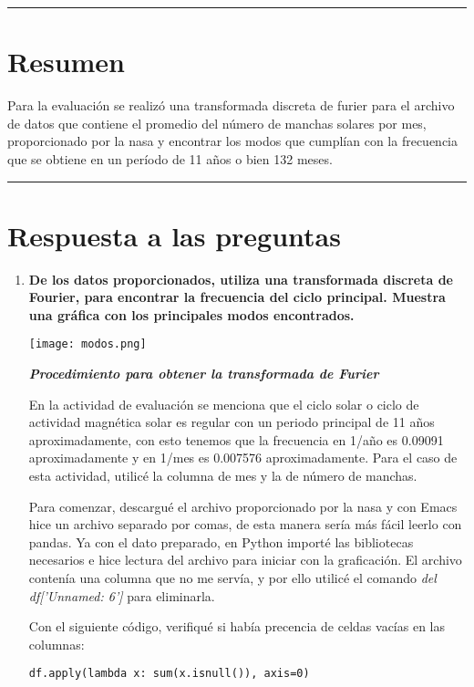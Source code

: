 \documentclass[12pt]{article}
\begin{document}
\begin{doublespace}
\hrule
\section*{Resumen}
Para la evaluación se realizó una transformada discreta de furier para el archivo de datos que contiene el promedio del número de manchas solares por mes, proporcionado por la nasa y encontrar los modos que cumplían con la frecuencia que se obtiene en un período de 11 años o bien 132 meses.
\vspace{0.6 cm}
\hrule

\vspace{0.6 cm}


\section*{Respuesta a las preguntas}
\begin{enumerate}
\item \textbf{De los datos proporcionados, utiliza una transformada discreta de Fourier, para encontrar la frecuencia del ciclo principal. Muestra una gráfica con los principales modos encontrados.}
\begin{center}
\texttt{[image: modos.png]}
\end{center}
\textbf{\textit{Procedimiento para obtener la transformada de Furier}}

En la actividad de evaluación se menciona que el ciclo solar o ciclo de actividad magnética solar es regular con un periodo principal de 11 años aproximadamente, con esto tenemos que la frecuencia en 1/año es 0.09091 aproximadamente y en 1/mes es 0.007576 aproximadamente. Para el caso de esta actividad, utilicé la columna de mes y la de número de manchas. 

Para comenzar, descargué el archivo proporcionado por la nasa y con Emacs hice un archivo separado por comas, de esta manera sería más fácil leerlo con pandas. Ya con el dato preparado, en Python importé las bibliotecas necesarios e hice lectura del archivo para iniciar con la graficación. El archivo contenía una columna que no me servía, y por ello utilicé el comando \textit{del df['Unnamed: 6']} para eliminarla. 

Con el siguiente código, verifiqué si había precencia de celdas vacías en las columnas:
\begin{verbatim}
df.apply(lambda x: sum(x.isnull()), axis=0)
\end{verbatim}


\end{enumerate}
\end{doublespace}
\end{document}
